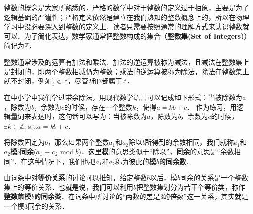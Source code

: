 
整数的概念是大家所熟悉的．严格的数学中对于整数的定义过于抽象，主要是为了逻辑基础的严谨性；严格定义依然是建立在我们熟知的整数概念上的，所以在物理学习中没必要深入到整数的定义上，读者只需要按照通常的理解方式来认识整数就可以．为了简化表达，数学家通常把整数构成的集合（\textbf{整数集(Set of Integers)}）简记为$\mathbb{Z}$．

整数通常涉及的运算有加法和乘法．加法的逆运算被称为减法，且减法在整数集上是封闭的，即两个整数相减仍为整数；乘法的逆运算被称为除法，除法在整数集上就不封闭，例如$\frac{2}{3}\not\in\mathbb{Z}$，尽管$2$和$3$都属于$\mathbb{Z}$． 

在中小学中我们学过带余除法，用现代数学语言可以记成如下形式：当被除数为$a$，除数为$b$，余数为$c$的时候，存在一个整数$k$，使得$a=kb+c$． 作为练习，用逻辑量词来表达时，这句话可以写为：当被除数为$a$，除数为$b$，余数为$c$的时候，$\exists k\in \mathbb{Z}$, s.t.$ a=kb+c$． 

将除数固定为$b$，那么如果两个整数$a_1$和$a_2$除以$b$所得到的余数相同，我们就称$a_1$和$a_2$\textbf{模}$b$\textbf{同余}($a_1\equiv a_2$ mod $b$)．这里\textbf{模}的意思类似于“除以”，\textbf{同余}的意思是“余数相同”．在这种情况下，我们也把$a_1$和$a_2$称为彼此的\textbf{模}$b$\textbf{的同余数}． 

由词条中对\textbf{等价关系}的讨论可以推知，给定整数$b$以后，模$b$同余的关系是一个整数集上的等价关系．也就是说，我们可以利用$b$把整数集划分为若干个等价类，称作\textbf{整数集模}$b$\textbf{的同余类}．在词条中所讨论的“两数的差是3的倍数”这一关系，其实就是一个模3同余的关系．